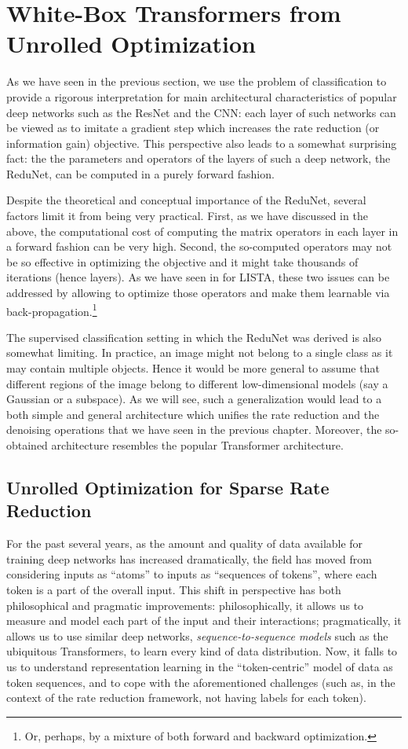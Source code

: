 \documentclass[../../book-main.tex]{subfiles}
\begin{document}
\section{White-Box Transformers from Unrolled
Optimization}\label{sec:chap4-white-box-transformer}
As we have seen in the previous section, we use the problem of
classification to provide a rigorous interpretation for main
architectural characteristics of popular deep networks such as the
ResNet and the CNN: each layer of such networks can be viewed as to
imitate a gradient step which increases the rate reduction (or
information gain) objective. This perspective also leads to a
somewhat surprising fact: the the parameters and operators  of the
layers of such a deep network, the ReduNet, can be  computed in a
purely forward fashion.

Despite the theoretical and conceptual importance of the ReduNet,
several factors limit it from being very practical. First, as we have
discussed in the above, the computational cost of computing the
matrix operators in  each layer in a forward fashion can be very
high. Second, the so-computed operators may not be so effective in
optimizing the objective and it might take thousands of iterations
(hence layers). As we have seen  in  for LISTA, these
two issues can be addressed by allowing to optimize those operators
and make them learnable via back-propagation.\footnote{Or, perhaps,
by a mixture of both forward and backward optimization.}

The supervised classification setting in which the ReduNet was
derived is also somewhat limiting. In practice, an image might not
belong to a single class as it may contain multiple objects. Hence it
would be more general to assume that different regions of the image
belong to  different low-dimensional models (say a Gaussian or a
subspace). As we will see, such a generalization would lead to a both
simple and general architecture which unifies the rate reduction and
the denoising operations that we have seen in the previous chapter.
Moreover, the so-obtained architecture resembles the popular
Transformer architecture.

\subsection{Unrolled Optimization for Sparse Rate Reduction}

For the past several years, as the amount and quality of data
available for training deep networks has increased dramatically,
the field has moved from considering inputs as ``atoms'' to inputs as
``sequences of tokens'', where each token is a part of the overall input.
This shift in perspective has both philosophical and pragmatic
improvements: philosophically, it allows us to measure and model each
part of the input and their interactions; pragmatically, it allows us
to use similar deep networks, \textit{sequence-to-sequence models}
such as the ubiquitous Transformers, to learn every kind of data
distribution. Now, it falls to us to understand representation
learning in the ``token-centric'' model of data as token sequences,
and to cope with the aforementioned challenges (such as, in the
context of the rate reduction framework, not having labels for each token).
\end{document}
